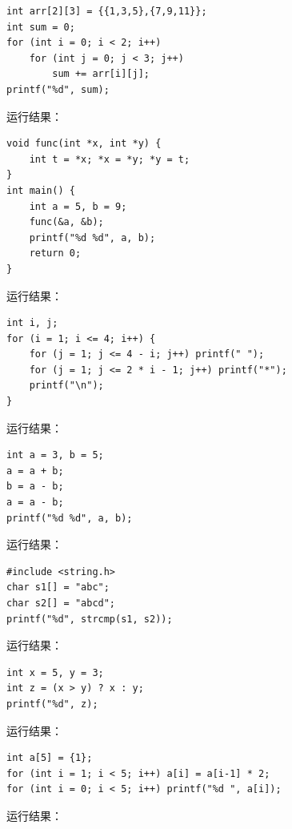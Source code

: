 \documentclass[a4paper,11pt]{article}
\begin{document}
\q
\begin{lstlisting}[language={[custom]C}]
int arr[2][3] = {{1,3,5},{7,9,11}};
int sum = 0;
for (int i = 0; i < 2; i++)
    for (int j = 0; j < 3; j++)
        sum += arr[i][j];
printf("%d", sum);
\end{lstlisting}
运行结果：\underline{\hspace{3cm}}


\q
\begin{lstlisting}[language={[custom]C}]
void func(int *x, int *y) {
    int t = *x; *x = *y; *y = t;
}
int main() {
    int a = 5, b = 9;
    func(&a, &b);
    printf("%d %d", a, b);
    return 0;
}
\end{lstlisting}
运行结果：\underline{\hspace{3cm}}


\q
\begin{lstlisting}[language={[custom]C}]
int i, j;
for (i = 1; i <= 4; i++) {
    for (j = 1; j <= 4 - i; j++) printf(" ");
    for (j = 1; j <= 2 * i - 1; j++) printf("*");
    printf("\n");
}
\end{lstlisting}
运行结果：\underline{\hspace{3cm}}


\q
\begin{lstlisting}[language={[custom]C}]
int a = 3, b = 5;
a = a + b;
b = a - b;
a = a - b;
printf("%d %d", a, b);
\end{lstlisting}
运行结果：\underline{\hspace{3cm}}


\q
\begin{lstlisting}[language={[custom]C}]
#include <string.h>
char s1[] = "abc";
char s2[] = "abcd";
printf("%d", strcmp(s1, s2));
\end{lstlisting}
运行结果：\underline{\hspace{3cm}}


\q
\begin{lstlisting}[language={[custom]C}]
int x = 5, y = 3;
int z = (x > y) ? x : y;
printf("%d", z);
\end{lstlisting}
运行结果：\underline{\hspace{3cm}}


\q
\begin{lstlisting}[language={[custom]C}]
int a[5] = {1};
for (int i = 1; i < 5; i++) a[i] = a[i-1] * 2;
for (int i = 0; i < 5; i++) printf("%d ", a[i]);
\end{lstlisting}
运行结果：\underline{\hspace{3cm}}
\end{document}

